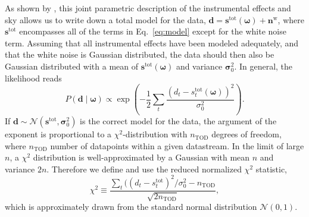 \documentclass[twocolumn]{../../common/aa}
\begin{document}
As shown by \citet{bp01}, this joint parametric description of the instrumental effects and sky allows us to write down a total model for the data, $\boldsymbol d=\boldsymbol s^\mathrm{tot}(\boldsymbol\omega)+\boldsymbol n^\mathrm w$, where $\boldsymbol s^\mathrm{tot}$ encompasses all of the terms in Eq.~\eqref{eq:model} except for the white noise term. Assuming that all instrumental effects have been modeled adequately, and that the white noise is Gaussian distributed, the data should then also be Gaussian distributed with a mean of $\boldsymbol s^\mathrm{tot}(\boldsymbol\omega)$ and variance $\boldsymbol \sigma_0^2$. In general, the likelihood reads
\begin{equation}
	P(\boldsymbol d\mid\boldsymbol\omega)\propto\exp\left(-\frac12\sum_t\frac{(d_t-s^\mathrm{tot}_t(\boldsymbol\omega))^2}{\sigma_0^2}
	\right).
\end{equation}
If $\boldsymbol d\sim\mathcal N(\boldsymbol s^\mathrm{tot},\boldsymbol\sigma_0^2)$ is the correct model for the data, the argument of the exponent is proportional to a $\chi^2$-distribution with $n_\mathrm{TOD}$ degrees of freedom, where $n_\mathrm{TOD}$ number of datapoints within a given datastream. In the limit of large $n$, a $\chi^2$ distribution is well-approximated by a Gaussian with mean $n$ and variance $2n$. Therefore we define and use the reduced normalized $\chi^2$ statistic,
\begin{equation}
  \chi^2\equiv \frac{\sum_t((d_t-s_t^\mathrm{tot})^2/\sigma_0^2 - n_\mathrm{TOD}}{\sqrt{2n_\mathrm{TOD}}},
  \label{eq:chisq}
\end{equation}
which is approximately drawn from the standard normal distribution $\mathcal N(0,1)$.
\end{document}
